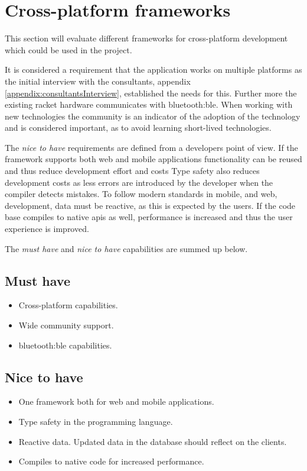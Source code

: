 \section{Cross-platform frameworks}

This section will evaluate different frameworks for cross-platform development which could be used in the project.

It is considered a requirement that the application works on multiple platforms as the initial interview with the consultants, appendix \ref{appendix:consultantsInterview}, established the needs for this. Further more the existing racket hardware communicates with \gls{bluetooth:ble}.
When working with new technologies the community is an indicator of the adoption of the technology and is considered important, as to avoid learning short-lived technologies.

The \textit{nice to have} requirements are defined from a developers point of view. 
If the framework supports both web and mobile applications functionality can be reused and thus reduce development effort and costs
Type safety also reduces development costs as less errors are introduced by the developer when the compiler detects mistakes.
To follow modern standards in mobile, and web, development, data must be reactive, as this is expected by the users.
If the code base compiles to native \glspl{api} as well, performance is increased and thus the user experience is improved.

The \textit{must have} and \textit{nice to have} capabilities are summed up below.
	
\subsection*{Must have}
\begin{itemize}
	\item Cross-platform capabilities.
	\item Wide community support.
	\item \gls{bluetooth:ble} capabilities.
\end{itemize}
	
\subsection*{Nice to have}
\begin{itemize}
	\item One framework both for web and mobile applications.
	\item Type safety in the programming language.
	\item Reactive data. Updated data in the database should reflect on the clients.
	\item Compiles to native code for increased performance.
\end{itemize}
	
